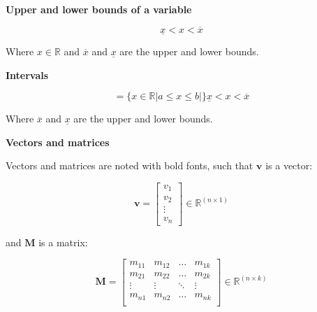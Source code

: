 \textbf{Upper and lower bounds of a variable}

\begin{equation}
\underline{x} < x < \overline{x} 
\end{equation}

 Where $x \in {\mathbb{R}} $ and $\overline{x}$ and $\underline{x}$ are the upper and lower bounds.
 
 \textbf{Intervals}

\begin{equation}
	[a,b] =  \{x \in \mathbb{R}|a\leq x \leq b|\}
\underline{x} < x < \overline{x} 
\end{equation}

 Where $\overline{x}$ and $\underline{x}$ are the upper and lower bounds.

 \textbf{Vectors and matrices}

Vectors and matrices are noted with bold fonts, such that $\bm{v}$ is a vector:

\begin{equation}
\bm{v} = 
\begin{bmatrix}

		 v_1 	\\
		 v_2 	\\
		 \vdots \\
		 v_n

\end{bmatrix}
\in \pmb{{\mathbb{R}}}^{(n \times 1)}
\end{equation}

and $\bm{M}$ is a matrix:

\begin{equation}
\bm{M} = 
\begin{bmatrix}

		 m_{11} & m_{12} & \hdots & m_{1k}	\\
		 m_{21} & m_{22} & \hdots & m_{2k}	\\
		 \vdots & \vdots & \ddots & \vdots	\\
		 m_{n1} & m_{n2} & \hdots &m_{nk} \\

\end{bmatrix}
\in \pmb{{\mathbb{R}}}^{(n \times k)}
\end{equation}



